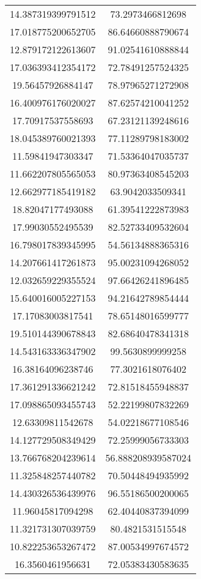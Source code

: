 \begin{table}
\begin{tabular}{cc}
14.387319399791512 & 73.2973466812698 \\
17.018775200652705 & 86.64660888790674 \\
12.879172122613607 & 91.02541610888844 \\
17.036393412354172 & 72.78491257524325 \\
19.56457926884147 & 78.97965271272908 \\
16.400976176020027 & 87.62574210041252 \\
17.70917537558693 & 67.23121139248616 \\
18.045389760021393 & 77.11289798183002 \\
11.59841947303347 & 71.53364047035737 \\
11.662207805565053 & 80.97363408545203 \\
12.662977185419182 & 63.9042033509341 \\
18.82047177493088 & 61.39541222873983 \\
17.99030552495539 & 82.52733409532604 \\
16.798017839345995 & 54.56134888365316 \\
14.207661417261873 & 95.00231094268052 \\
12.032659229355524 & 97.66426241896485 \\
15.640016005227153 & 94.21642789854444 \\
17.17083003817541 & 78.65148016599777 \\
19.510144390678843 & 82.68640478341318 \\
14.543163336347902 & 99.5630899999258 \\
16.38164096238746 & 77.3021618076402 \\
17.361291336621242 & 72.81518455948837 \\
17.098865093455743 & 52.22199807832269 \\
12.63309811542678 & 54.02218677108546 \\
14.127729508349429 & 72.25999056733303 \\
13.766768204239614 & 56.888208939587024 \\
11.325848257440782 & 70.50448494935992 \\
14.430326536439976 & 96.55186500200065 \\
11.96045817094298 & 62.40440837394099 \\
11.321731307039759 & 80.4821531515548 \\
10.822253653267472 & 87.00534997674572 \\
16.3560461956631 & 72.05383430583635 \\

\end{tabular}
\end{table}
